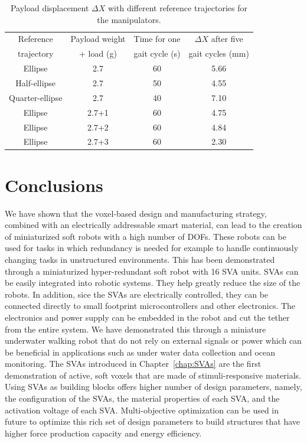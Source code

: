 \begin{table}[t]
\centering
\caption{Payload displacement $\Delta X$ with different reference trajectories for the manipulators.}
\label{table:table_Payload displacement}
\begin{tabular}{c c c c}

\hline
Reference & Payload weight & Time for one & $\Delta X$ after five \\
trajectory & + load (g) & gait cycle (s) & gait cycles (mm)\\
\hline
Ellipse         & 2.7   & 60  & 5.66\\
Half-ellipse    & 2.7   & 50  & 4.55\\
Quarter-ellipse & 2.7   & 40  & 7.10\\
Ellipse         & 2.7+1 & 60  & 4.75\\
Ellipse         & 2.7+2 & 60  & 4.84\\
Ellipse         & 2.7+3 & 60  & 2.30\\
\hline
\end{tabular}
\end{table}

\section{Conclusions}
We have shown that the voxel-based design and manufacturing strategy, combined with an electrically addressable smart material, can lead to the creation of miniaturized soft robots with a high number of DOFs. These robots can be used for tasks in which redundancy is needed for example to handle continuously changing tasks in unstructured environments. This has been demonstrated through a miniaturized hyper-redundant soft robot with 16 SVA units.
SVAs can be easily integrated into robotic systems. They help greatly reduce the size of the robots. In addition, sice the SVAs are electrically controlled, they can be connected directly to small footprint microcontrollers and other electronics. The electronics and power supply can be embedded in the robot  and cut the tether from the entire system. We have demonstrated this through a miniature underwater walking robot that do not rely on external signals or power which can be beneficial in applications such as under water data collection and ocean monitoring. The SVAs introduced in Chapter~\ref{chap:SVAs} are the first demonstration of active, soft voxels that are made of stimuli-responsive materials. Using SVAs as building blocks offers higher number of design parameters, namely, the configuration of the SVAs, the material properties of each SVA, and the activation voltage of each SVA. Multi-objective optimization can be used in future to optimize this rich set of design parameters to build structures that have higher force production capacity and %
energy efficiency.

